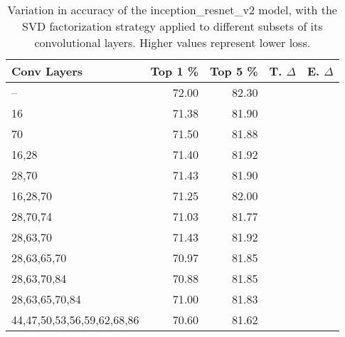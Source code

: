 \begin{table}
\centering
\begin{tabular}{|l|r|r|r|r|}
\hline
Conv Layers & Top 1 \% & Top 5 \% & T. $\Delta$ & E. $\Delta$ \\\hline
-- & 72.00 & 82.30 &  & \\\hline
16 & 71.38 & 81.90 &  &  \\\hline
70 & 71.50 & 81.88 &  &  \\\hline
16,28 & 71.40 & 81.92 &  &  \\\hline
28,70 & 71.43 & 81.90 &  &  \\\hline
16,28,70 & 71.25 & 82.00 &  &  \\\hline
28,70,74 & 71.03 & 81.77 &  &  \\\hline
28,63,70 & 71.43 & 81.92 &  &  \\\hline
28,63,65,70 & 70.97 & 81.85 &  &  \\\hline
28,63,70,84 & 70.88 & 81.85 &  &  \\\hline
28,63,65,70,84 & 71.00 & 81.83 &  &  \\\hline
44,47,50,53,56,59,62,68,86 & 70.60 & 81.62 &  &  \\\hline
\end{tabular}
\caption{Variation in accuracy of the inception\_resnet\_v2 model, with the SVD factorization strategy applied to different subsets of its convolutional layers. Higher values represent lower loss.}
\label{inception_resnet_v2-accuracy}
\end{table}
